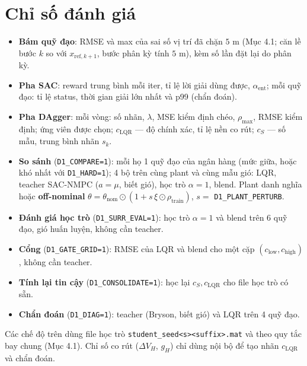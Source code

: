 \documentclass[11pt]{article}
\newcommand{\cS}{c_{S}}
\newcommand{\cL}{c_{\mathrm{LQR}}}
\begin{document}
\section{Chỉ số đánh giá}
\begin{itemize}[leftmargin=1.4em,itemsep=1pt]
\item \textbf{Bám quỹ đạo}: RMSE và max của sai số vị trí đã chặn $5$ m (Mục 4.1; căn lề bước $k$ so với
$x_{\mathrm{ref},k+1}$, bước phân kỳ tính $5$ m), kèm số lần đặt lại do phân kỳ.
\item \textbf{Pha SAC}: reward trung bình mỗi iter, tỉ lệ lời giải dùng được, $\alpha_{\mathrm{ent}}$; mỗi quỹ đạo:
tỉ lệ status, thời gian giải lớn nhất và p99 (chẩn đoán).
\item \textbf{Pha DAgger}: mỗi vòng: số nhãn, $\lambda$, MSE kiểm định chéo, $\rho_{\max}$, RMSE kiểm định; ứng
viên được chọn; $\cL$ --- độ chính xác, tỉ lệ nền co rút; $\cS$ --- số mẫu, trung bình nhãn $s_k$.
\item \textbf{So sánh} (\texttt{D1\_COMPARE=1}): mỗi họ 1 quỹ đạo của ngân hàng (mức giữa, hoặc khó nhất với
\texttt{D1\_HARD=1}); 4 bộ trên cùng plant và cùng mẫu gió: LQR, teacher SAC-NMPC ($a=\mu$, biết gió), học
trò $\alpha=1$, blend. Plant danh nghĩa hoặc \textbf{off-nominal}
$\theta=\theta_{\mathrm{nom}}\odot(1+s\,\xi\odot\rho_{\mathrm{train}})$, $s=$ \texttt{D1\_PLANT\_PERTURB}.
\item \textbf{Đánh giá học trò} (\texttt{D1\_SURR\_EVAL=1}): học trò $\alpha=1$ và blend trên 6 quỹ đạo, gió huấn
luyện, không cần teacher.
\item \textbf{Cổng} (\texttt{D1\_GATE\_GRID=1}): RMSE của LQR và blend cho một cặp
$(c_{\mathrm{low}},c_{\mathrm{high}})$, không cần teacher.
\item \textbf{Tính lại tin cậy} (\texttt{D1\_CONSOLIDATE=1}): học lại $\cS,\cL$ cho file học trò có sẵn.
\item \textbf{Chẩn đoán} (\texttt{D1\_DIAG=1}): teacher (Bryson, biết gió) và LQR trên 4 quỹ đạo.
\end{itemize}
Các chế độ trên dùng file học trò \texttt{student\_seed<s><suffix>.mat} và theo quy tắc bay chung (Mục 4.1).
Chỉ số co rút ($\Delta V_H$, $g_H$) chỉ dùng nội bộ để tạo nhãn $\cL$ và chẩn đoán.
\end{document}
